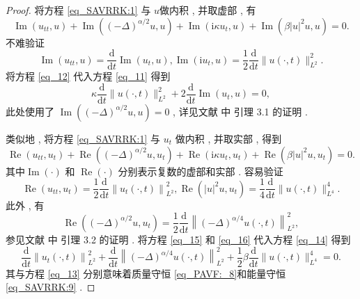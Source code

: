 \begin{proof}
	将方程 \eqref{eq_SAVRRK:1} 与 $u$做内积 , 并取虚部 , 有
\begin{equation}
\operatorname{Im}\left(u_{t t} , u\right)+\operatorname{Im}\left((-\Delta)^{\alpha / 2} u , u\right)+\operatorname{Im}\left(\mathrm{i} \kappa u_{t} , u\right)+\operatorname{Im}\left(\beta|u|^{2} u , u\right)=0  . 
\label{eq_11}\end{equation}
不难验证
\begin{equation}
\operatorname{Im}\left(u_{t t} , u\right)=\frac{\mathrm{d}}{\mathrm{d} t} \operatorname{Im}\left(u_{t} , u\right) , \operatorname{Im}\left(\mathrm{i} u_{t} , u\right)=\frac{1}{2} \frac{\mathrm{d}}{\mathrm{d} t}\|u(\cdot , t)\|_{L^{2}}^{2}  . 
\label{eq_12}\end{equation}
将方程 \eqref{eq_12} 代入方程 \eqref{eq_11} 得到
\begin{equation}
\kappa \frac{\mathrm{d}}{\mathrm{d} t}\|u(\cdot , t)\|_{L^{2}}^{2}+2 \frac{\mathrm{d}}{\mathrm{d} t} \operatorname{Im}\left(u_{t} , u\right)=0 , 
\label{eq_13}\end{equation}
此处使用了 $\operatorname{Im}\left((-\Delta)^{\alpha / 2} u , u\right)=0$ , 
详见文献 \citep{guoExistenceGlobalSmooth2008}中 引理 3.1 的证明 . 

类似地 , 将方程 \eqref{eq_SAVRRK:1} 与 $u_{t}$ 做内积 , 并取实部 , 得到
\begin{equation}
\operatorname{Re}\left(u_{t t} , u_{t}\right)+\operatorname{Re}\left((-\Delta)^{\alpha / 2} u , u_{t}\right)+\operatorname{Re}\left(\mathrm{i} \kappa u_{t} , u_{t}\right)+\operatorname{Re}\left(\beta|u|^{2} u , u_{t}\right)=0  . 
\label{eq_14}\end{equation}
其中$\operatorname{Im}(\cdot)$ 和 $\operatorname{Re}(\cdot)$ 分别表示复数的虚部和实部 . 容易验证
\begin{equation}
\operatorname{Re}\left(u_{t t} , u_{t}\right)=\frac{1}{2} \frac{\mathrm{d}}{\mathrm{d} t}\left\|u_{t}(\cdot , t)\right\|_{L^{2}}^{2} , \operatorname{Re}\left(|u|^{2} u , u_{t}\right)=\frac{1}{4} \frac{\mathrm{d}}{\mathrm{d} t}\|u(\cdot , t)\|_{L^{4}}^{4}  . 
\label{eq_15}\end{equation}
此外 , 有
\begin{equation}
\operatorname{Re}\left((-\Delta)^{\alpha / 2} u , u_{t}\right)=\frac{1}{2} \frac{\mathrm{d}}{\mathrm{d} t}\left\|(-\Delta)^{\alpha / 4} u(\cdot , t)\right\|_{L^{2}}^{2} , 
\label{eq_16}\end{equation}
参见文献 \citep{guoExistenceGlobalSmooth2008}中 引理 3.2 的证明 . 
将方程 \eqref{eq_15} 和 \eqref{eq_16} 代入方程 \eqref{eq_14} 得到
\begin{equation}
\frac{\mathrm{d}}{\mathrm{d} t}\left\|u_{t}(\cdot , t)\right\|_{L^{2}}^{2}+\frac{\mathrm{d}}{\mathrm{d} t}\left\|(-\Delta)^{\alpha / 4} u(\cdot , t)\right\|_{L^{2}}^{2}+\frac{1}{2} \beta \frac{\mathrm{d}}{\mathrm{d} t}\|u(\cdot , t)\|_{L^{4}}^{4}=0  . 
\label{eq_17}\end{equation}
其与方程 \eqref{eq_13} 分别意味着质量守恒 \eqref{eq_PAVF:_8}和能量守恒 \eqref{eq_SAVRRK:9} . 

\end{proof}

